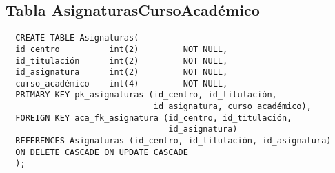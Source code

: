 \subsection{Tabla AsignaturasCursoAcadémico}

\begin{verbatim}
  CREATE TABLE Asignaturas(
  id_centro          int(2)         NOT NULL,
  id_titulación      int(2)         NOT NULL,
  id_asignatura      int(2)         NOT NULL,
  curso_académico    int(4)         NOT NULL,
  PRIMARY KEY pk_asignaturas (id_centro, id_titulación,
                              id_asignatura, curso_académico),
  FOREIGN KEY aca_fk_asignatura (id_centro, id_titulación,
                                 id_asignatura)
  REFERENCES Asignaturas (id_centro, id_titulación, id_asignatura)
  ON DELETE CASCADE ON UPDATE CASCADE
  );
\end{verbatim}